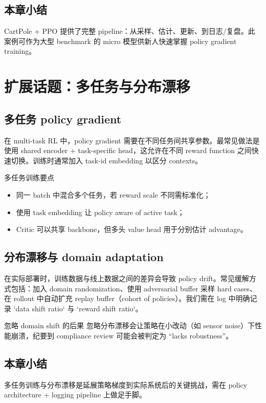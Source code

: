 \documentclass[a4paper]{article}
\begin{document}
\subsection{本章小结}
CartPole + PPO 提供了完整 pipeline：从采样、估计、更新、到日志/复盘。此案例可作为大型 benchmark 的 micro 模型供新人快速掌握 policy gradient training。

\section{扩展话题：多任务与分布漂移}
\subsection{多任务 policy gradient}
在 multi-task RL 中，policy gradient 需要在不同任务间共享参数。最常见做法是使用 shared encoder + task-specific head，这允许在不同 reward function 之间快速切换。训练时通常加入 task-id embedding 以区分 contexts。

\begin{knowledgebox}{多任务训练要点}
\begin{itemize}
    \item 同一 batch 中混合多个任务，若 reward scale 不同需标准化；
    \item 使用 task embedding 让 policy aware of active task；
    \item Critic 可以共享 backbone，但多头 value head 用于分别估计 advantage。
\end{itemize}
\end{knowledgebox}

\subsection{分布漂移与 domain adaptation}
在实际部署时，训练数据与线上数据之间的差异会导致 policy drift。常见缓解方式包括：加入 domain randomization、使用 adversarial buffer 采样 hard cases、在 rollout 中自动扩充 replay buffer（cohort of policies）。我们需在 log 中明确记录 `data shift ratio` 与 `reward shift ratio`。

\begin{warningbox}{忽略 domain shift 的后果}
忽略分布漂移会让策略在小改动（如 sensor noise）下性能崩溃，纪要到 compliance review 可能会被判定为 “lacks robustness”。
\end{warningbox}

\subsection{本章小结}
多任务训练与分布漂移是延展策略梯度到实际系统后的关键挑战，需在 policy architecture + logging pipeline 上做足手脚。
\end{document}
